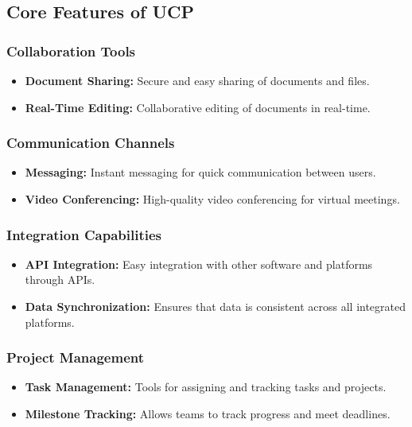 \documentclass[a4paper,12pt]{report}
\begin{document}
	\subsection{Core Features of UCP}
	
	\subsubsection{Collaboration Tools}
	\begin{itemize}
		\item \textbf{Document Sharing:} Secure and easy sharing of documents and files.
		\item \textbf{Real-Time Editing:} Collaborative editing of documents in real-time.
	\end{itemize}
	
	\subsubsection{Communication Channels}
	\begin{itemize}
		\item \textbf{Messaging:} Instant messaging for quick communication between users.
		\item \textbf{Video Conferencing:} High-quality video conferencing for virtual meetings.
	\end{itemize}
	
	\subsubsection{Integration Capabilities}
	\begin{itemize}
		\item \textbf{API Integration:} Easy integration with other software and platforms through APIs.
		\item \textbf{Data Synchronization:} Ensures that data is consistent across all integrated platforms.
	\end{itemize}
	
	\subsubsection{Project Management}
	\begin{itemize}
		\item \textbf{Task Management:} Tools for assigning and tracking tasks and projects.
		\item \textbf{Milestone Tracking:} Allows teams to track progress and meet deadlines.
	\end{itemize}
	
\end{document}
